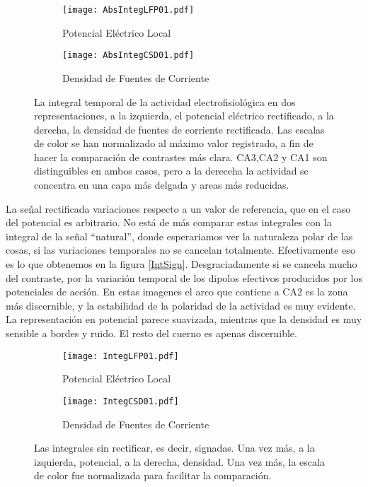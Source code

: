 \documentclass{article}
\begin{document}
\begin{figure}[h]
    \centering
    \begin{subfigure}[b]{0.45\textwidth}
        \texttt{[image: AbsIntegLFP01.pdf]}
        \caption{Potencial Eléctrico Local}
        \label{IntAbsLFP}
    \end{subfigure}
    \begin{subfigure}[b]{0.45\textwidth}
        \texttt{[image: AbsIntegCSD01.pdf]}
        \caption{Densidad de Fuentes de Corriente}
        \label{IntAbsCSD}
    \end{subfigure}
    \caption{La integral temporal de la actividad electrofisiológica en dos representaciones, a la izquierda, el potencial eléctrico rectificado, a la derecha, la densidad de fuentes de corriente rectificada. Las escalas de color se han normalizado al máximo valor registrado, a fin de hacer la comparación de contrastes más clara. CA3,CA2 y CA1 son distinguibles en ambos casos, pero a la dereceha la actividad se concentra en una capa más delgada y areas más reducidas. } 
\end{figure}

La señal rectificada variaciones respecto a un valor de referencia, que en el caso del potencial es arbitrario. No está de más comparar estas integrales con la integral de la señal ``natural'', donde esperariamos ver la naturaleza polar de las cosas, si las variaciones temporales no se cancelan totalmente. Efectivamente eso es lo que obtenemos en la figura \ref{IntSign}. Desgraciadamente si se cancela mucho del contraste, por la variación temporal de los dipolos efectivos producidos por los potenciales de acción.
En estas imagenes el arco que contiene a CA2 es la zona más discernible, y la estabilidad de la polaridad de la actividad es muy evidente. La representación en potencial parece suavizada, mientras que la densidad es muy sensible a bordes y ruido. El resto del cuerno es apenas discernible. 


\begin{figure}[h]
    \centering
    \begin{subfigure}[b]{0.45\textwidth}
        \texttt{[image: IntegLFP01.pdf]}
        \caption{Potencial Eléctrico Local}
        \label{IntAbsLFP}
    \end{subfigure}
    \begin{subfigure}[b]{0.45\textwidth}
        \texttt{[image: IntegCSD01.pdf]}
        \caption{Densidad de Fuentes de Corriente}
        \label{IntAbsCSD}
    \end{subfigure}
    \caption{Las integrales sin rectificar, es decir, signadas. Una vez más, a la izquierda, potencial, a la derecha, densidad. Una vez más, la escala de color fue normalizada para facilitar la comparación. } 
\end{figure}
\end{document}
